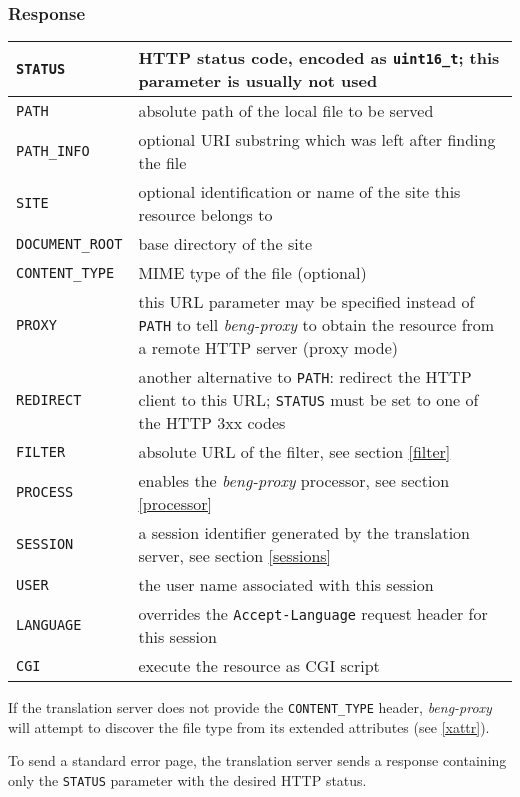 \documentclass[a4paper,12pt]{article}
\begin{document}
\subsubsection{Response}

\begin{tabular}{|l|p{10cm}|}
\hline
\texttt{STATUS} & HTTP status code, encoded as \texttt{uint16\_t};
this parameter is usually not used \\
\hline
\texttt{PATH} & absolute path of the local file to be served \\
\hline
\texttt{PATH\_INFO} & optional URI substring which was left after
finding the file \\
\hline
\texttt{SITE} & optional identification or name of the site this
resource belongs to \\
\hline
\texttt{DOCUMENT\_ROOT} & base directory of the site \\
\hline
\texttt{CONTENT\_TYPE} & MIME type of the file (optional) \\
\hline
\texttt{PROXY} & this URL parameter may be specified instead of
\texttt{PATH} to tell \emph{beng-proxy} to obtain the resource from a
remote HTTP server (proxy mode) \\
\hline
\texttt{REDIRECT} & another alternative to \texttt{PATH}: redirect the
HTTP client to this URL; \texttt{STATUS} must be set to one of the
HTTP 3xx codes \\
\hline
\texttt{FILTER} & absolute URL of the filter, see section \ref{filter} \\
\hline
\texttt{PROCESS} & enables the \emph{beng-proxy} processor, see
section \ref{processor} \\
\hline
\texttt{SESSION} & a session identifier generated by the translation
server, see section \ref{sessions} \\
\hline
\texttt{USER} & the user name associated with this session \\
\hline
\texttt{LANGUAGE} & overrides the \texttt{Accept-Language} request
header for this session \\
\hline
\texttt{CGI} & execute the resource as CGI script \\
\hline
\end{tabular}

If the translation server does not provide the \texttt{CONTENT\_TYPE}
header, \emph{beng-proxy} will attempt to discover the file type from
its extended attributes (see \ref{xattr}).

To send a standard error page, the translation server sends a response
containing only the \texttt{STATUS} parameter with the desired HTTP
status.
\end{document}
